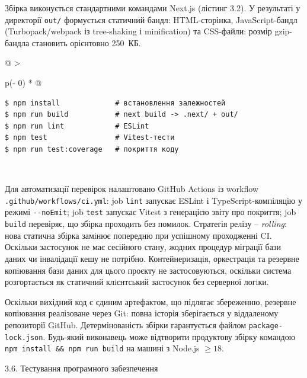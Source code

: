 \documentclass[
]{article}
\begin{document}
Збірка виконується стандартними командами Next.js (лістинг 3.2). У
результаті у директорії \texttt{out}\texttt{/} формується статичний
бандл: HTML-сторінка, JavaScript-бандл (Turbopack/webpack із
tree-shaking і minification) та CSS-файли: розмір gzip-бандла становить
орієнтовно 250~КБ.

\begin{longtable}[]{@{}
  >{\raggedright\arraybackslash}p{}@{}}
\caption{Лістинг 3.2. Команди збірки та перевірки проєкту. Джерело:
розроблено автором.}\tabularnewline
\toprule\noalign{}
\endfirsthead
\endhead
\bottomrule\noalign{}
\endlastfoot
\begin{minipage}[t]{\linewidth}\raggedright
\begin{verbatim}
$ npm install             # встановлення залежностей
$ npm run build           # next build -> .next/ + out/
$ npm run lint            # ESLint
$ npm test                # Vitest-тести
$ npm run test:coverage   # покриття коду
\end{verbatim}
\end{minipage} \\
\end{longtable}

Для автоматизації перевірок налаштовано GitHub Actions із workflow
\texttt{.}\texttt{github}\texttt{/}\texttt{workflows}\texttt{/}\texttt{ci.yml}:
job \texttt{lint} запускає ESLint і TypeScript-компіляцію у режимі
\texttt{-\/-}\texttt{noEmit}; job \texttt{test} запускає Vitest з
генерацією звіту про покриття; job \texttt{build} перевіряє, що збірка
проходить без помилок. Стратегія релізу -- \emph{rolling}: нова статична
збірка замінює попередню при успішному проходженні CI. Оскільки
застосунок не має сесійного стану, жодних процедур міграції бази даних
чи інвалідації кешу не потрібно. Контейнеризацiя, оркестрацiя та
резервне копiювання бази даних для цього проєкту не застосовуються,
оскiльки система розгортається як статичний клiєнтський застосунок без
серверної логiки.

Оскільки вихідний код є єдиним артефактом, що підлягає збереженню,
резервне копіювання реалізоване через Git: повна історія зберігається у
віддаленому репозиторії GitHub. Детермінованість збірки гарантується
файлом \texttt{package-lock.json}. Будь-який виконавець може відтворити
продуктову збірку командою
\texttt{npm}\texttt{\ }\texttt{install}\texttt{\ \&\&\ }\texttt{npm}\texttt{\ }\texttt{run}\texttt{\ }\texttt{build}
на машині з Node.js \(\geq 18\).

\protect{}\label{_Toc229681157}{}3.6. Тестування
програмного забезпечення
\end{document}
